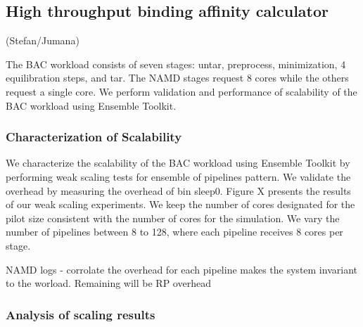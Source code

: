 \subsection{High throughput binding affinity calculator}

(Stefan/Jumana)

The BAC workload consists of seven stages: untar, preprocess, minimization, 4 equilibration steps, and tar. The NAMD stages request 8 cores while the others request a single core. We perform validation and performance of scalability of the BAC workload using Ensemble Toolkit. 

\subsubsection{Characterization of Scalability}

We characterize the scalability of the BAC workload using Ensemble Toolkit by performing weak scaling tests for ensemble of pipelines pattern. We validate the overhead by measuring the overhead of bin sleep0. Figure X presents the results of our weak scaling experiments. We keep the number of cores designated for the pilot size consistent with the number of cores for the simulation. We vary the number of pipelines between 8 to 128, where each pipeline receives 8 cores per stage. 

NAMD logs - corrolate the overhead for each pipeline makes the system invariant to the worload. Remaining will be RP overhead    

\subsubsection{Analysis of scaling results}

